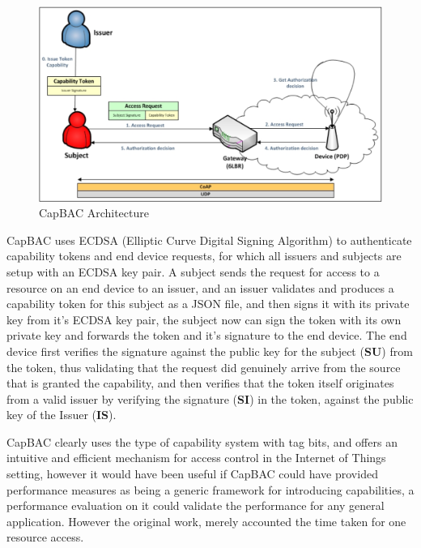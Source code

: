 \begin{figure}[h]
\centering
\includegraphics[scale = 0.2]{img/capBac}
\caption{CapBAC Architecture }
\label{fig:capbac}
\end{figure}

CapBAC uses ECDSA (Elliptic Curve Digital Signing Algorithm) to authenticate capability tokens and end device requests, for which all issuers and subjects are setup with an ECDSA key pair. A subject sends the request for access to a resource on an end device to an issuer, and an issuer validates and produces a capability token for this subject as a JSON file, and then signs it with its private key from it's ECDSA key pair, the subject now can sign the token with its own private key and forwards the token and it's signature to the end device. The end device first verifies the signature against the public key for the subject (\textbf{SU}) from the token, thus validating that the request did genuinely arrive from the source that is granted the capability, and then verifies that the token itself originates from a valid issuer by verifying the signature (\textbf{SI}) in the token, against the public key of the Issuer (\textbf{IS}).

CapBAC clearly uses the type of capability system with tag bits, and offers an intuitive and efficient mechanism for access control in the Internet of Things setting, however it would have been useful if CapBAC could have provided performance measures as being a generic framework for introducing capabilities, a performance evaluation on it could validate the performance for any general application.  However the original work, merely accounted the time taken for one resource access.

